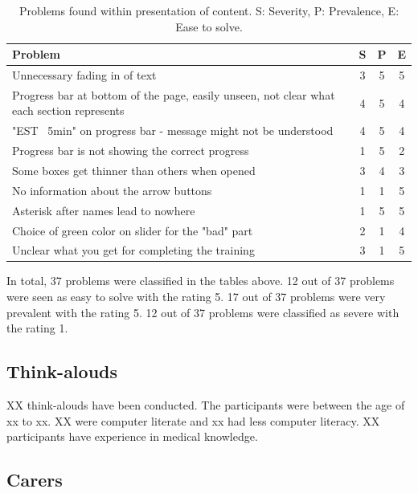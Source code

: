 \documentclass{sigchi}
\begin{document}
\begin{table}[H]
    \centering
    \begin{tabular}{|m{6.5cm}|c|c|c|}
    \hline
        \textbf{Problem} & \textbf{S} & \textbf{P} & \textbf{E}\\
    \hline
         Unnecessary fading in of text  & 3 & 5 & 5\\
    \hline
         Progress bar at bottom of the page, easily unseen, not clear what each section represents & 4 & 5 & 4\\
    \hline
         "EST ~5min" on progress bar - message might not be understood & 4 & 5 & 4\\
    \hline
         Progress bar is not showing the correct progress & 1 & 5 & 2\\
    \hline
         Some boxes get thinner than others when opened & 3 & 4 & 3\\
    \hline
         No information about the arrow buttons & 1 & 1 & 5\\
    \hline
         Asterisk after names lead to nowhere & 1 & 5 & 5\\
    \hline
         Choice of green color on slider for the "bad" part & 2 & 1 & 4\\
    \hline
         Unclear what you get for completing the training  & 3 & 1 & 5\\
    \hline
    \end{tabular}
    \caption{Problems found within presentation of content. S: Severity, P: Prevalence, E: Ease to solve.}
    \label{tab:content}
\end{table}

In total, 37 problems were classified in the tables above. 12 out of 37 problems were seen as easy to solve with the rating 5. 17 out of 37 problems were very prevalent with the rating 5. 12 out of 37 problems were classified as severe with the rating 1.

\subsection{Think-alouds}
XX think-alouds have been conducted. The participants were between the age of xx to xx. XX were computer literate and xx had less computer literacy. XX participants have experience in medical knowledge. 

\subsection{Carers}
\end{document}
